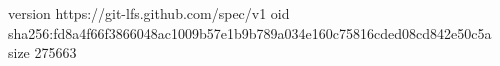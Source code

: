 version https://git-lfs.github.com/spec/v1
oid sha256:fd8a4f66f3866048ac1009b57e1b9b789a034e160c75816cded08cd842e50c5a
size 275663
